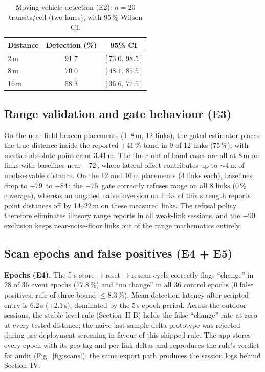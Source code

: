 \documentclass[journal,10pt]{IEEEtran}
\newcommand{\dBm}{\text{dBm}}
\begin{document}
\begin{table}[htbp]
\centering
\caption{Moving-vehicle detection (E2): $n = 20$ transits/cell (two lanes),
with 95\,\% Wilson CI.}
\label{tab:vehicle_det}
\footnotesize
\begin{tabular}{@{}lcc@{}}
\toprule
\textbf{Distance} & \textbf{Detection (\%)} & \textbf{95\% CI} \\
\midrule
2\,m  & 91.7 & $[73.0,\,98.5]$ \\
8\,m  & 70.0 & $[48.1,\,85.5]$ \\
16\,m & 58.3 & $[36.6,\,77.5]$ \\
\bottomrule
\end{tabular}
\end{table}

\subsection{Range validation and gate behaviour (E3)}
On the near-field beacon placements (1--8\,m, 12 links), the gated estimator
places the true distance inside the reported $\pm41\,\%$ band in 9 of 12
links (75\,\%), with median absolute point error 3.41\,m. The three
out-of-band cases are all at 8\,m on links with baselines near
$-72$\,\dBm, where lateral offset contributes up to $\sim$4\,m of
unobservable distance. On the 12 and 16\,m placements (4 links each),
baselines drop to $-79$\,\dBm{} to $-84$\,\dBm; the $-75$\,\dBm{} gate
correctly refuses range on all 8 links (0\,\% coverage), whereas an ungated
naive inversion on links of this strength reports point distances off by
14--22\,m on these measured links. The refusal policy therefore
eliminates illusory range reports in all weak-link sessions, and the
$-90$\,\dBm{} exclusion keeps near-noise-floor links out of the range
mathematics entirely.

\subsection{Scan epochs and false positives (E4 + E5)}
\textbf{Epochs (E4).} The 5-s store$\to$reset$\to$rescan cycle correctly
flags ``change'' in 28 of 36 event epochs (77.8\,\%) and ``no change'' in all
36 control epochs (0 false positives; rule-of-three bound $\leq8.3\,\%$).
Mean detection latency after scripted entry is 6.2\,s ($\pm2.1$\,s),
dominated by the 5\,s epoch period. Across the outdoor sessions, the
stable-level rule (Section~II-B) holds the false-``change'' rate at zero at
every tested distance; the naive last-sample delta prototype was rejected
during pre-deployment screening in favour of this shipped rule. The app stores every epoch with its geo-tag and per-link deltas and reproduces the rule's verdict for audit (Fig.~\ref{fig:scans}); the same export path produces the session logs behind Section~IV.
\end{document}
